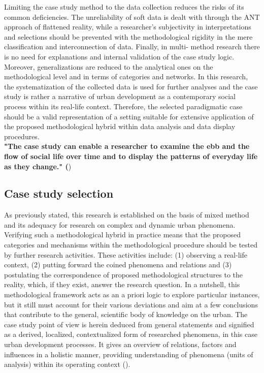 \documentclass[11pt]{report}
\begin{document}
Limiting the case study method to the data collection reduces the risks of its common deficiencies. The unreliability of soft data is dealt with through the ANT approach of flattened reality, while a researcher’s subjectivity in interpretations and selections should be prevented with the methodological rigidity in the mere classification and interconnection of data. Finally, in multi- method research there is no need for explanations and internal validation of the case study logic. Moreover, generalizations are reduced to the analytical ones on the methodological level and in terms of categories and networks. In this research, the systematization of the collected data is used for further analyses and the case study is rather a narrative of urban development as a contemporary social process within its real-life context. Therefore, the selected paradigmatic case should be a valid representation of a setting suitable for extensive application of the proposed methodological hybrid within data analysis and data display procedures.
\\

\textbf{"The case study can enable a researcher to examine the ebb and the flow of social life over time and to display the patterns of everyday life as they change." (\href{Feagin}{\citealt{feagin_case_1991}}})

\subsection{Case study selection}

As previously stated, this research is established on the basis of mixed method and its adequacy for research on complex and dynamic urban phenomena. Verifying such a methodological hybrid in practice means that the proposed categories and mechanisms within the methodological procedure should be tested by further research activities. These activities include: (1) observing a real-life context, (2) putting forward the coined phenomena and relations and (3) postulating the correspondence of proposed methodological structures to the reality, which, if they exist, answer the research question. In a nutshell, this methodological framework acts as an a priori logic to explore particular instances, but it still must account for their various deviations and aim at a few conclusions that contribute to the general, scientific body of knowledge on the urban. The case study point of view is herein deduced from general statements and signified as a derived, localized, contextualized form of researched phenomena, in this case urban development processes. It gives an overview of relations, factors and influences in a holistic manner, providing understanding of phenomena (units of analysis) within its operating context  (\href{Harrison}{\citealt{partington_case_2002}}).
\\
\end{document}
